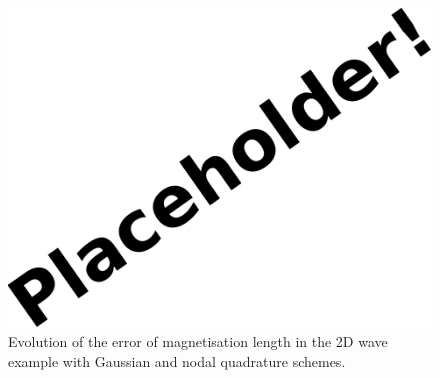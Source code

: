 \begin{figure}[ht!]
  \centering
  \includegraphics{images/placeholder}
  \caption{Evolution of the error of magnetisation length in the 2D wave example with Gaussian and nodal quadrature schemes.}
  \label{fig:mean-ml-error-2d}
\end{figure}







